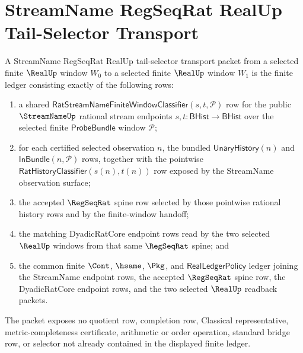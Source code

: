 \section{StreamName RegSeqRat RealUp Tail-Selector Transport}
\label{sec:streamname-regseqrat-realup-tail-selector-transport}

\begin{definition}
\label{def:streamname-regseqrat-realup-tail-selector-transport-packet}
A StreamName RegSeqRat RealUp tail-selector transport packet from a selected
finite $\RealUp$ window $W_0$ to a selected finite $\RealUp$ window $W_1$ is
the finite ledger consisting exactly of the following rows:
\begin{enumerate}
\item a shared
$\mathsf{RatStreamNameFiniteWindowClassifier}(s,t,\mathcal P)$ row for the
public $\StreamNameUp$ rational stream endpoints $s,t:\mathsf{BHist}\to
\mathsf{BHist}$ over the selected finite $\mathsf{ProbeBundle}$ window
$\mathcal P$;
\item for each certified selected observation $n$, the bundled
$\mathsf{UnaryHistory}(n)$ and $\mathsf{InBundle}(n,\mathcal P)$ rows, together
with the pointwise $\mathsf{RatHistoryClassifier}(s(n),t(n))$ row exposed by
the StreamName observation surface;
\item the accepted $\RegSeqRat$ spine row selected by those pointwise rational
history rows and by the finite-window handoff;
\item the matching DyadicRatCore endpoint rows read by the two selected
$\RealUp$ windows from that same $\RegSeqRat$ spine; and
\item the common finite $\Cont$, $\hsame$, $\Pkg$, and
$\mathsf{RealLedgerPolicy}$ ledger joining the StreamName endpoint rows, the
accepted $\RegSeqRat$ spine row, the DyadicRatCore endpoint rows, and the two
selected $\RealUp$ readback packets.
\end{enumerate}

The packet exposes no quotient row, completion row, Classical representative,
metric-completeness certificate, arithmetic or order operation, standard
bridge row, or selector not already contained in the displayed finite ledger.
\end{definition}

